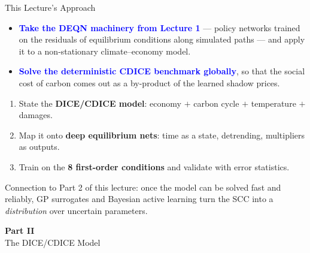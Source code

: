 \documentclass[aspectratio=169,11pt]{beamer}
\newcommand{\emphc}[1]{\textcolor{harvardcrimson}{#1}}
\begin{document}
\begin{frame}{This Lecture's Approach}
\begin{itemize}
    \item \textcolor{blue}{\textbf{Take the DEQN machinery from Lecture 1}} --- policy networks trained on the residuals of equilibrium conditions along simulated paths --- and apply it to a \emphc{non-stationary} climate--economy model.
    \item \textcolor{blue}{\textbf{Solve the deterministic CDICE benchmark globally}}, so that the social cost of carbon comes out as a by-product of the learned shadow prices.
\end{itemize}

\vspace{0.2cm}
\begin{enumerate}
    \item State the \textbf{DICE/CDICE model}: economy $+$ carbon cycle $+$ temperature $+$ damages.
    \item Map it onto \textbf{deep equilibrium nets}: time as a state, detrending, multipliers as outputs.
    \item Train on the \textbf{8 first-order conditions} and validate with error statistics.
\end{enumerate}

\vspace{0.2cm}
{\footnotesize \emphc{Connection to Part 2 of this lecture:} once the model can be solved fast and reliably, GP surrogates and Bayesian active learning turn the SCC into a \emph{distribution} over uncertain parameters.}
\end{frame}



\begin{frame}{}
\vfill
\begin{center}
{\Huge \textcolor{uzhblue}{\textbf{Part II}}}\\[12pt]
{\LARGE The DICE/CDICE Model}
\end{center}
\vfill
\end{frame}
\end{document}
